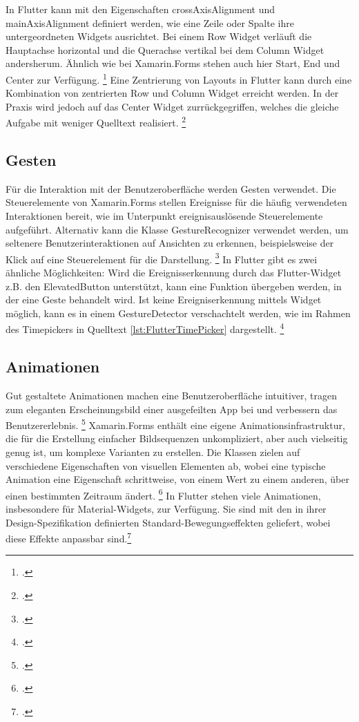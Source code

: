 In Flutter kann mit den Eigenschaften \glq crossAxisAlignment\grq{} und \glq mainAxisAlignment\grq{} definiert werden, wie eine Zeile oder Spalte ihre untergeordneten Widgets ausrichtet. Bei einem \glq Row\grq{} Widget verläuft die Hauptachse horizontal und die Querachse vertikal bei dem \glq Column\grq{} Widget andersherum. Ähnlich wie bei Xamarin.Forms stehen auch hier \glq Start\grq ,  \glq End\grq{} und \glq Center\grq{} zur Verfügung. \footcite[Vgl.][Abgerufen am \today]{GoogleAlignWidgets}  Eine Zentrierung von Layouts in Flutter kann durch eine Kombination von zentrierten  \glq Row\grq{} und \glq Column\grq{} Widget erreicht werden.  In der Praxis wird jedoch auf das \glq Center\grq{} Widget zurrückgegriffen, welches die gleiche Aufgabe mit weniger Quelltext realisiert. \footcite[Vgl.][Abgerufen am \today]{GoogleCenter} 

\subsection{Gesten}
Für die Interaktion mit der Benutzeroberfläche werden Gesten verwendet.  Die Steuerelemente von Xamarin.Forms stellen Ereignisse für die häufig verwendeten Interaktionen bereit, wie im Unterpunkt ereignisauslösende Steuerelemente aufgeführt.  Alternativ kann die Klasse \glq GestureRecognizer\grq{}  verwendet werden, um seltenere Benutzerinteraktionen auf Ansichten zu erkennen, beispielsweise der Klick auf eine Steuerelement für die Darstellung.  \footcite[Vgl.][Abgerufen am \today]{MicrosoftGesten2020} 
In Flutter gibt es zwei ähnliche Möglichkeiten: Wird die Ereignisserkennung durch das Flutter-Widget z.B. den \glq ElevatedButton\grq{} unterstützt,  kann eine Funktion übergeben werden,  in der eine Geste behandelt wird.  Ist keine Ereigniserkennung mittels Widget möglich,  kann es in einem \glq GestureDetector\grq{} verschachtelt werden, wie im Rahmen des \glq Timepickers\grq{} in Quelltext \ref{lst:FlutterTimePicker} dargestellt. \footcite[Vgl.][Abgerufen am \today]{GoogleGesture2020} 

\subsection{Animationen}
Gut gestaltete Animationen machen eine Benutzeroberfläche intuitiver, tragen zum eleganten Erscheinungsbild einer ausgefeilten App bei und verbessern das Benutzererlebnis.  \footcite[Vgl.][Abgerufen am \today]{GoogleFlutterAnimations2020} 
Xamarin.Forms enthält eine eigene Animationsinfrastruktur,  die für die Erstellung einfacher Bildsequenzen unkompliziert,  aber auch vielseitig genug ist,  um komplexe Varianten zu erstellen.  Die Klassen zielen auf verschiedene Eigenschaften von visuellen Elementen ab, wobei eine typische Animation eine Eigenschaft schrittweise, von einem Wert zu einem anderen, über einen bestimmten Zeitraum ändert. \footcite[Vgl.][Abgerufen am \today]{Microsoftanimations2020} 
In Flutter stehen viele Animationen,  insbesondere für Material-Widgets,  zur Verfügung.  Sie sind mit den in ihrer Design-Spezifikation definierten Standard-Bewegungseffekten geliefert,  wobei diese Effekte anpassbar sind.\footcite[Vgl.][Abgerufen am \today]{GoogleFlutterAnimations2020} 

